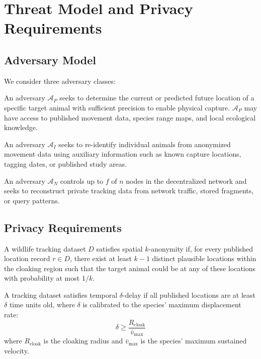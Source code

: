 \section{Threat Model and Privacy Requirements}


\subsection{Adversary Model}

We consider three adversary classes:

\begin{definition}
An adversary $\mathcal{A}_P$ seeks to determine the current or predicted future location of a specific target animal with sufficient precision to enable physical capture. $\mathcal{A}_P$ may have access to published movement data, species range maps, and local ecological knowledge.
\end{definition}

\begin{definition}
An adversary $\mathcal{A}_I$ seeks to re-identify individual animals from anonymized movement data using auxiliary information such as known capture locations, tagging dates, or published study areas.
\end{definition}

\begin{definition}
An adversary $\mathcal{A}_N$ controls up to $f$ of $n$ nodes in the decentralized network and seeks to reconstruct private tracking data from network traffic, stored fragments, or query patterns.
\end{definition}

\subsection{Privacy Requirements}

\begin{definition}
A wildlife tracking dataset $D$ satisfies spatial $k$-anonymity if, for every published location record $r \in D$, there exist at least $k-1$ distinct plausible locations within the cloaking region such that the target animal could be at any of these locations with probability at most $1/k$.
\end{definition}

\begin{definition}
A tracking dataset satisfies temporal $\delta$-delay if all published locations are at least $\delta$ time units old, where $\delta$ is calibrated to the species' maximum displacement rate:
\begin{equation}
\delta \geq \frac{R_{\text{cloak}}}{\bar{v}_{\max}}
\end{equation}
where $R_{\text{cloak}}$ is the cloaking radius and $\bar{v}_{\max}$ is the species' maximum sustained velocity.
\end{definition}

